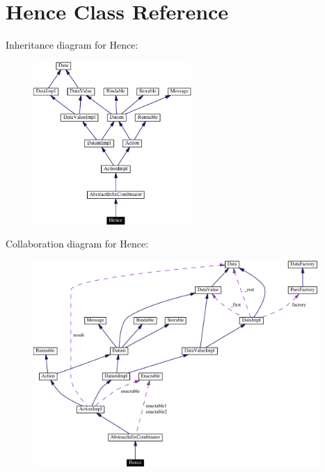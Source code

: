 \hypertarget{classHence}{
\section{Hence  Class Reference}
\label{classHence}
}
Inheritance diagram for Hence:\begin{figure}[H]
\begin{center}
\leavevmode
\includegraphics[width=170pt]{classHence__inherit__graph}
\end{center}
\end{figure}
Collaboration diagram for Hence:\begin{figure}[H]
\begin{center}
\leavevmode
\includegraphics[width=308pt]{classHence__coll__graph}
\end{center}
\end{figure}
